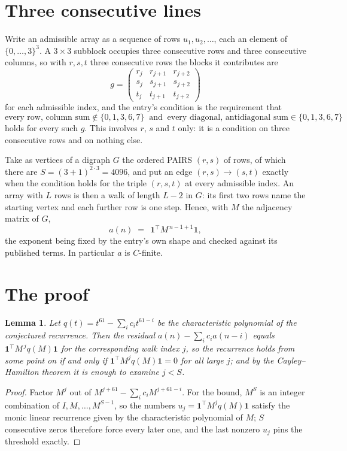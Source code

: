 \documentclass[11pt,a4paper]{article}
\theoremstyle{plain}
\newtheorem{lemma}[theorem]{Lemma}
\theoremstyle{definition}
\begin{document}
\section{Three consecutive lines}

Write an admissible array as a sequence of rows $u_1,u_2,\dots$, each an element of
$\{0,\dots,3\}^{3}$. A $3\times3$ subblock occupies three consecutive rows and
three consecutive columns, so with $r,s,t$ three consecutive rows the blocks it
contributes are
\[
g=\begin{pmatrix}r_j&r_{j+1}&r_{j+2}\\ s_j&s_{j+1}&s_{j+2}\\ t_j&t_{j+1}&t_{j+2}\end{pmatrix}
\]
for each admissible index, and the entry's condition is the requirement that
\[
\text{every row, column sum} \notin \{0,1,3,6,7\}\ \text{ and }\ \text{every diagonal, antidiagonal sum} \in \{0,1,3,6,7\}
\]
holds for every such $g$. This involves $r$, $s$ and $t$ only: it is a condition on
three consecutive rows and on nothing else.

Take as vertices of a digraph $G$ the ordered PAIRS $(r,s)$ of rows, of which there are
$S=(3+1)^{2\cdot3}=4096$, and put an edge $(r,s)\to(s,t)$ exactly when the condition
holds for the triple $(r,s,t)$ at every admissible index. An array with $L$ rows is then a
walk of length $L-2$ in $G$: its first two rows name the starting vertex and each further
row is one step. Hence, with $M$ the adjacency matrix of $G$,
\[
a(n)\;=\;\,\mathbf{1}^{\!\top}M^{\,n-1+1}\mathbf{1},
\]
the exponent being fixed by the entry's own shape and checked against its published terms.
In particular $a$ is $C$-finite.

\section{The proof}

\begin{lemma}\label{lem:crit}
Let $q(t)=t^{61}-\sum_i c_it^{61-i}$ be the characteristic polynomial of the
conjectured recurrence. Then the residual $a(n)-\sum_ic_ia(n-i)$ equals
$\mathbf{1}^{\!\top}M^{\,j}q(M)\mathbf{1}$ for the corresponding walk index
$j$, so the recurrence holds from some point on if and only if
$\mathbf{1}^{\!\top}M^{j}q(M)\mathbf{1}=0$ for all large $j$; and by the
Cayley--Hamilton theorem it is enough to examine $j<S$.
\end{lemma}

\begin{proof}
Factor $M^{j}$ out of $M^{j+61}-\sum_ic_iM^{j+61-i}$. For the bound, $M^{S}$
is an integer combination of $I,M,\dots,M^{S-1}$, so the numbers
$u_j=\mathbf{1}^{\!\top}M^{j}q(M)\mathbf{1}$ satisfy the monic linear recurrence given by
the characteristic polynomial of $M$; $S$ consecutive zeros therefore force every later one,
and the last nonzero $u_j$ pins the threshold exactly.
\end{proof}
\end{document}
